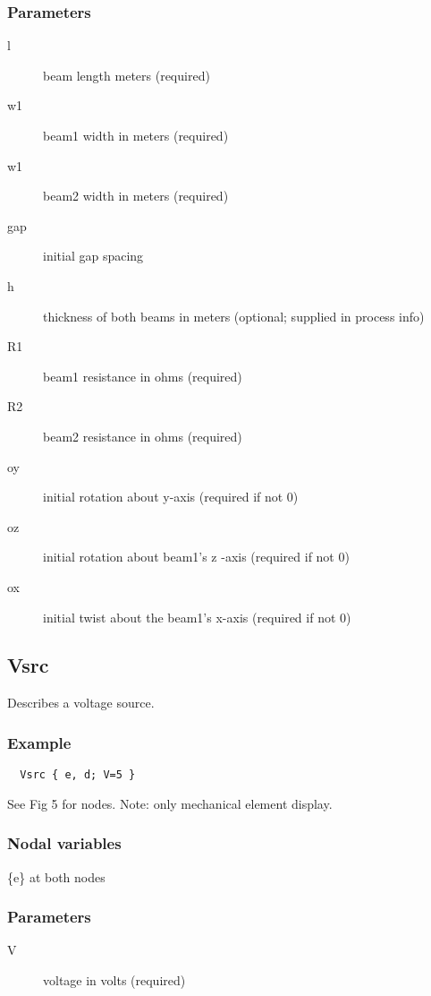 \subsubsection*{Parameters}
\begin{description}
 \item[l] beam length meters (required) 
 \item[w1] beam1 width in meters (required) 
 \item[w1] beam2 width in meters (required) 
 \item[gap] initial gap spacing 
 \item[h] thickness of both beams in meters (optional; supplied in process info) 
 \item[R1] beam1 resistance in ohms (required) 
 \item[R2] beam2 resistance in ohms (required) 
 \item[oy] initial rotation about y-axis (required if not 0) 
 \item[oz] initial rotation about beam1's z -axis (required if not 0) 
 \item[ox] initial twist about the beam1's x-axis (required if not 0) 
\end{description}
 
\subsection{Vsrc}
 
Describes a voltage source. 
 
\subsubsection*{Example}
\begin{verbatim}
  Vsrc { e, d; V=5 }
\end{verbatim}

See Fig 5 for nodes. Note: only mechanical element display. 

\subsubsection*{Nodal variables}
\{e\} at both nodes 
 
\subsubsection*{Parameters}
\begin{description}
 \item[V] voltage in volts (required) 
\end{description}
        
